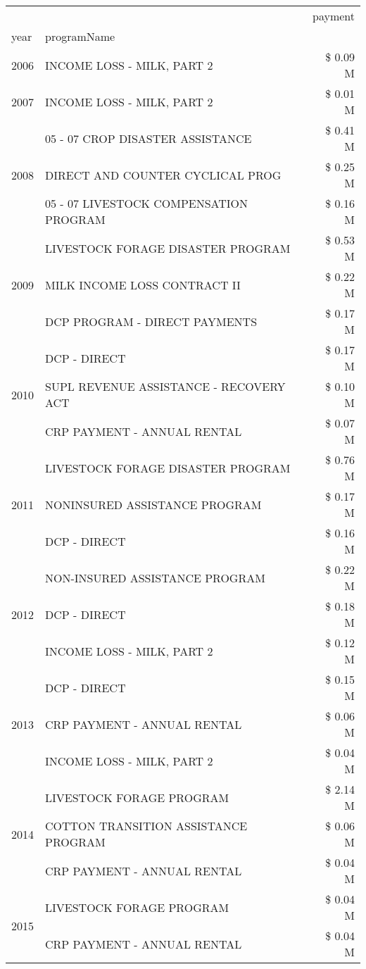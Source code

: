 \begin{tabular}{llr}
\toprule
 &  & payment \\
year & programName &  \\
\midrule
2006 & INCOME LOSS - MILK, PART 2 & \$ 0.09 M \\
\cline{1-3}
2007 & INCOME LOSS - MILK, PART 2 & \$ 0.01 M \\
\cline{1-3}
\multirow[t]{3}{*}{2008} & 05 - 07 CROP DISASTER ASSISTANCE & \$ 0.41 M \\
 & DIRECT AND COUNTER CYCLICAL PROG & \$ 0.25 M \\
 & 05 - 07 LIVESTOCK COMPENSATION PROGRAM & \$ 0.16 M \\
\cline{1-3}
\multirow[t]{3}{*}{2009} & LIVESTOCK FORAGE DISASTER  PROGRAM & \$ 0.53 M \\
 & MILK INCOME LOSS CONTRACT II & \$ 0.22 M \\
 & DCP PROGRAM - DIRECT PAYMENTS & \$ 0.17 M \\
\cline{1-3}
\multirow[t]{3}{*}{2010} & DCP - DIRECT & \$ 0.17 M \\
 & SUPL REVENUE ASSISTANCE - RECOVERY ACT & \$ 0.10 M \\
 & CRP PAYMENT - ANNUAL RENTAL & \$ 0.07 M \\
\cline{1-3}
\multirow[t]{3}{*}{2011} & LIVESTOCK FORAGE DISASTER PROGRAM & \$ 0.76 M \\
 & NONINSURED ASSISTANCE PROGRAM & \$ 0.17 M \\
 & DCP - DIRECT & \$ 0.16 M \\
\cline{1-3}
\multirow[t]{3}{*}{2012} & NON-INSURED ASSISTANCE PROGRAM & \$ 0.22 M \\
 & DCP - DIRECT & \$ 0.18 M \\
 & INCOME LOSS - MILK, PART 2 & \$ 0.12 M \\
\cline{1-3}
\multirow[t]{3}{*}{2013} & DCP - DIRECT & \$ 0.15 M \\
 & CRP PAYMENT - ANNUAL RENTAL & \$ 0.06 M \\
 & INCOME LOSS - MILK, PART 2 & \$ 0.04 M \\
\cline{1-3}
\multirow[t]{3}{*}{2014} & LIVESTOCK FORAGE PROGRAM & \$ 2.14 M \\
 & COTTON TRANSITION ASSISTANCE PROGRAM & \$ 0.06 M \\
 & CRP PAYMENT - ANNUAL RENTAL & \$ 0.04 M \\
\cline{1-3}
\multirow[t]{3}{*}{2015} & LIVESTOCK FORAGE PROGRAM & \$ 0.04 M \\
 & CRP PAYMENT - ANNUAL RENTAL & \$ 0.04 M \\

\end{tabular}
